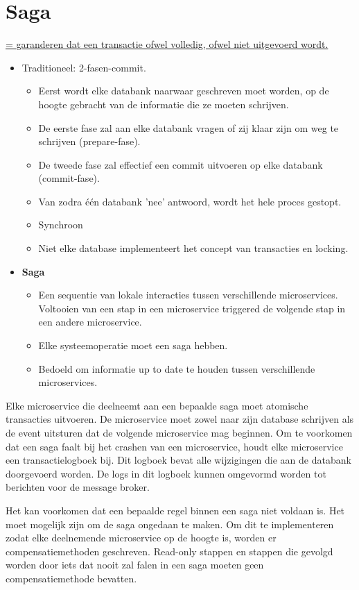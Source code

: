 	\chapter{Saga}
	\uline{= garanderen dat een transactie ofwel volledig, ofwel niet uitgevoerd wordt.}
	\begin{itemize}
		\item Traditioneel: 2-fasen-commit.
		\begin{itemize}
			\item Eerst wordt elke databank naarwaar geschreven moet worden, op de hoogte gebracht van de informatie die ze moeten schrijven.
			\item De eerste fase zal aan elke databank vragen of zij klaar zijn om weg te schrijven (prepare-fase).
			\item De tweede fase zal effectief een commit uitvoeren op elke databank (commit-fase).
			\item Van zodra één databank 'nee' antwoord, wordt het hele proces gestopt.
			\item[\alert] Synchroon
			\item[\alert] Niet elke database implementeert het concept van transacties en locking.
		\end{itemize}
		\item \textbf{Saga}
		\begin{itemize}
			\item Een sequentie van lokale interacties tussen verschillende microservices. Voltooien van een stap in een microservice triggered de volgende stap in een andere microservice.
			\item Elke systeemoperatie moet een saga hebben.
			\item Bedoeld om informatie up to date te houden tussen verschillende microservices.
		\end{itemize}
	\end{itemize}

	Elke microservice die deelneemt aan een bepaalde saga moet atomische transacties uitvoeren. De microservice moet zowel naar zijn database schrijven als de event uitsturen dat de volgende microservice mag beginnen. Om te voorkomen dat een saga faalt bij het crashen van een microservice, houdt elke microservice een transactielogboek bij. Dit logboek bevat alle wijzigingen die aan de databank doorgevoerd worden. De logs in dit logboek kunnen omgevormd worden tot berichten voor de message broker. 

	Het kan voorkomen dat een bepaalde regel binnen een saga niet voldaan is. Het moet mogelijk zijn om de saga ongedaan te maken. Om dit te implementeren zodat elke deelnemende microservice op de hoogte is, worden er compensatiemethoden geschreven. Read-only stappen en stappen die gevolgd worden door iets dat nooit zal falen in een saga moeten geen compensatiemethode bevatten.

